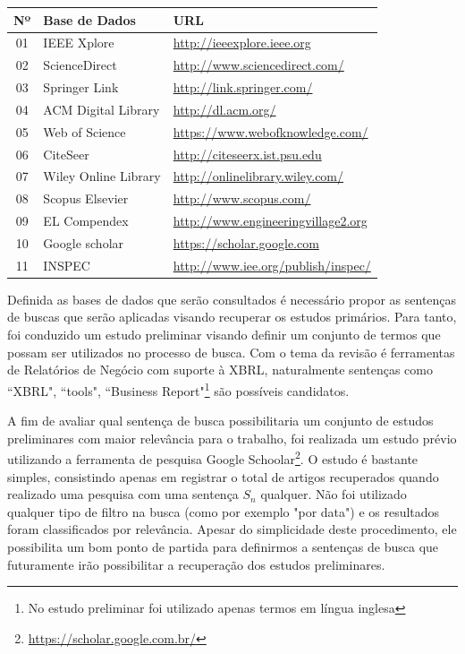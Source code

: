 \documentclass{article}
\begin{document}
\begin{center}
\begin{tabular}{cll}
\label{tab:base-dados}
 Nº&Base de Dados&URL\\
\hline
01 & IEEE Xplore  & \url{http://ieeexplore.ieee.org}\\
02 & ScienceDirect  & \url{http://www.sciencedirect.com/}\\
03 & Springer Link & \url{http://link.springer.com/}\\
04 & ACM Digital Library & \url{http://dl.acm.org/}\\
05 & Web of Science & \url{https://www.webofknowledge.com/}\\
06 & CiteSeer & \url{http://citeseerx.ist.psu.edu}\\
07 & Wiley Online Library & \url{http://onlinelibrary.wiley.com/}\\
08 & Scopus Elsevier & \url{http://www.scopus.com/}\\
09 & EL Compendex & \url{http://www.engineeringvillage2.org}\\
10 & Google scholar & \url{https://scholar.google.com}\\
11 &INSPEC  & \url{http://www.iee.org/publish/inspec/}\\
\end{tabular}
\end{center}


Definida as bases de dados que serão consultados é necessário propor as sentenças de buscas que serão aplicadas visando recuperar os estudos primários. Para tanto, foi conduzido um estudo preliminar visando definir um conjunto de termos que possam ser utilizados no processo de busca. Com o tema da revisão é ferramentas de Relatórios de Negócio com suporte à XBRL, naturalmente sentenças como ``XBRL", ``tools", ``Business Report"\footnote{No estudo preliminar foi utilizado apenas termos em língua inglesa} são possíveis candidatos.

A fim de avaliar qual sentença de busca possibilitaria um conjunto de estudos preliminares com maior relevância para o trabalho, foi realizada um estudo prévio utilizando a ferramenta de pesquisa Google Schoolar\footnote{\url{https://scholar.google.com.br/}}. O estudo é bastante simples, consistindo apenas em registrar o total de artigos recuperados quando realizado uma pesquisa com uma sentença $S_n$ qualquer. Não foi utilizado qualquer tipo de filtro na busca (como por exemplo "por data") e os resultados foram classificados por relevância. Apesar do simplicidade deste procedimento, ele possibilita um bom ponto de partida para definirmos a sentenças de busca que futuramente irão possibilitar a recuperação dos estudos preliminares.
\end{document}
